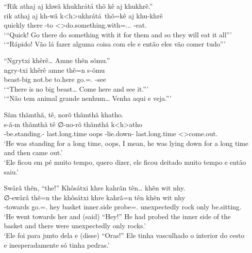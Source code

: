 \documentclass[output=paper,
modfonts,nonflat
]{langsci/langscibook}
\begin{document}
\ea  ``Rik athaj aj khwã khukhrátá thõ kê aj khukhrẽ.'' \\[.3em]
\gll rik     athaj aj    kh-wã     k<h>ukhrátá\ thõ=kê                              aj    khu-khrẽ         \\
     quickly there \Pl{} \Third-to <\Third>do.something.with=\AAnd.\Ds.\Third.\Fut{} \Pl{} \Third-eat.\Pl{} \\
\glt `{}``Quick! Go there do something with it for them and so they will eat it all''{}' \\
     `{}``Rápido! Vão lá fazer alguma coisa com ele e então eles vão comer tudo''{}' \\
\z

\ea  ``Ngrytxi khêrê\ldots{} Amne thẽn sõmu.'' \\[.3em]
\gll ngry-txi  khêrê  amne    thẽ=n             s-õmu      \\
     beast-big not.be to.here go.\Sg=\AAnd.\Ss{} \Third-see \\
\glt `{}``There is no big beast\ldots{} Come here and see it.''{}' \\
     `{}``Não tem animal grande nenhum\ldots{} Venha aqui e veja.''{}' \\
\z

\ea  Sãm thãmthã, tê, norõ thãmthã khatho. \\[.3em]
\gll s-ã-m                          thãmthã        tê   ∅-no-rõ                 thãmthã        k<h>atho               \\
     \Third-be.standing.\Sg-\Nmlz{} last.long.time oops \Third-lie.down-\Nmlz{} last.long.time <\Third>come.out.\Sg{} \\
\glt `He was standing for a long time, oops, I mean, he was lying down for a long time and then came out.' \\
     `Ele ficou em pé muito tempo, quero dizer, ele ficou deitado muito tempo e então saiu.' \\
\z

\ea  Swârâ thẽn, ``the!'' Khôsátxi khre kahrãn tên\ldots{} khẽn wit nhy. \\[.3em]
\gll ∅-swârâ        thẽ=n             the khôsátxi khre       kahrã=n          tên          khẽn wit  nhy              \\
     \Third-towards go.\Sg=\AAnd.\Ss{} hey basket   inner.side probe=\AAnd.\Ss{} unexpectedly rock only be.sitting.\Sg{} \\
\glt `He went towards her and (said) ``Hey!'' He had probed the inner side of the basket and there were unexpectedly only rocks.' \\
     `Ele foi para junto dela e (disse) ``Oras!'' Ele tinha vasculhado o interior do cesto e inesperadamente só tinha pedras.' \\
\z
\end{document}
